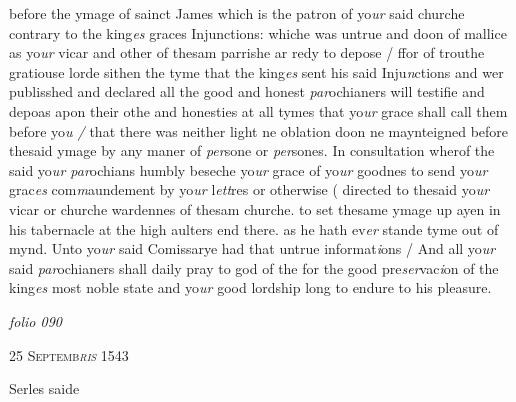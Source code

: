 \documentclass[12pt, a4paper]{book}
\begin{document}
		
		\ifthenelse{\isodd{\thepage}}
		{\reversemarginpar}
		{\normalmarginpar}
		 before the ymage of sainct James which is the patron
 of yo\textit{ur }said churche contrary to the king\textit{es} graces
 Injunctions: whiche was untrue and doon of mallice
 as yo\textit{ur} vicar and other of thesam parrishe ar
 redy to depose / ffor of trouthe gratiouse lorde sithen
 the tyme that the king\textit{es} sent his said Inju\textit{n}ctions
 and wer publisshed and declared all the good and
 honest \textit{par}ochianers will testifie and depoas apon their
 othe and honesties at all tymes that yo\textit{ur} grace
 shall call them before yo\textit{u /} that there was neither
 light ne oblation doon ne maynteigned before thesaid
  ymage by any maner of \textit{per}sone or \textit{per}sones. In
 consultation wherof the said yo\textit{ur par}ochians humbly
			beseche yo\textit{ur} grace of yo\textit{ur} goodnes to send yo\textit{ur} grac\textit{es}
 com\textit{m}aundement by yo\textit{ur} l\textit{ett}res or otherwise ( directed
 to thesaid yo\textit{ur} vicar or churche wardennes of thesam
 churche. to set thesame ymage up ayen in his
 tabernacle at the high aulters end there.
 as he hath ev\textit{er} stande tyme out of mynd. Unto yo\textit{ur} said
 Comissarye had that untrue informat\textit{i}ons / And
 all yo\textit{ur} said \textit{par}ochianers shall daily pray to god
 of the for the good pre\textit{ser}vac\textit{i}on of the king\textit{es} most
			noble state and yo\textit{ur} good lordship long to
 endure to his pleasure.
	


            
\dotfill
						\newpage
{}

\textit{folio 090}


            
               
				\begin{center} \begin{large} {\scshape 
               	25 Septemb\textit{ris} 1543
               } \end{large} \end{center}
			

 
 	
			
 	
		\ifthenelse{\isodd{\thepage}}
		{\reversemarginpar}
		{\normalmarginpar}
		Serles
			 saide
 	
\end{document}

